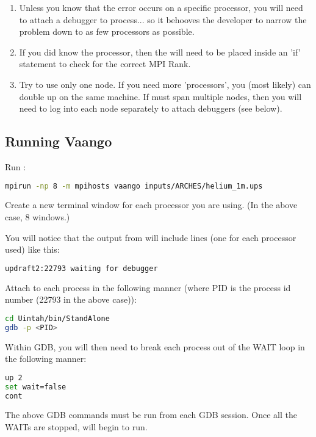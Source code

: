\begin{enumerate}
 \item  Unless you know that the error occurs on a specific processor, you will need to attach a debugger to 
process... so it behooves the developer to narrow the problem down to
as few processors as possible.

 \item  If you did know the processor, then the  will
need to be placed inside an 'if' statement to check for the correct
MPI Rank.

 \item  Try to use only one node.  If you need more 'processors', you (most
likely) can double up on the same machine.  If  must span multiple
nodes, then you will need to log into each node separately to attach
debuggers (see below).
\end{enumerate}

\subsection{Running Vaango}

Run :

\begin{lstlisting}[language=sh,backgroundcolor=\color{background}]
mpirun -np 8 -m mpihosts vaango inputs/ARCHES/helium_1m.ups
\end{lstlisting}

Create a new terminal window for each processor you are using.  (In
the above case, 8 windows.)  

You will notice that the output from  will include lines (one for
each processor used) like this:

\begin{lstlisting}[language=sh,backgroundcolor=\color{background}]
updraft2:22793 waiting for debugger
\end{lstlisting}

Attach to each process in the following manner (where PID is the
process id number (22793 in the above case)):

\begin{lstlisting}[language=sh,backgroundcolor=\color{background}]
cd Uintah/bin/StandAlone
gdb -p <PID>
\end{lstlisting}

Within GDB, you will then need to break each process out of the WAIT loop in the
following manner:

\begin{lstlisting}[language=sh,backgroundcolor=\color{background}]
up 2
set wait=false
cont
\end{lstlisting}

The above GDB commands must be run from each GDB session.  Once all
the WAITs are stopped,  will begin to run.



